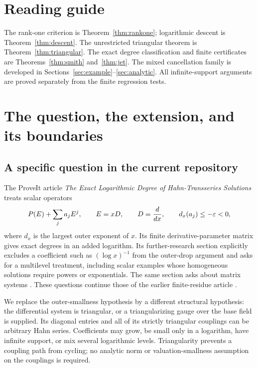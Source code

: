 \documentclass[11pt,a4paper]{article}
\numberwithin{equation}{section}
\theoremstyle{definition}
\theoremstyle{remark}\newtheorem{remark}[theorem]{Remark}
\begin{document}
\section*{Reading guide}
The rank-one criterion is Theorem~\ref{thm:rankone}; logarithmic descent is Theorem~\ref{thm:descent}. The unrestricted triangular theorem is Theorem~\ref{thm:triangular}. The exact degree classification and finite certificates are Theorems~\ref{thm:smith} and~\ref{thm:jet}. The mixed cancellation family is developed in Sections~\ref{sec:example}--\ref{sec:analytic}. All infinite-support arguments are proved separately from the finite regression tests.
\clearpage

\section{The question, the extension, and its boundaries}
\label{sec:intro}
\subsection{A specific question in the current repository}
The ProveIt article \emph{The Exact Logarithmic Degree of Hahn-Transseries Solutions} treats scalar operators
\begin{equation}
 P(E)+\sum_j a_j E^j,\qquad E=xD,\qquad D=\frac{d}{dx},
 \qquad d_x(a_j)\le-\varepsilon<0,
 \label{eq:oldclass}
\end{equation}
where $d_x$ is the largest outer exponent of $x$. Its finite derivative-parameter matrix gives exact degrees in an added logarithm. Its further-research section explicitly excludes a coefficient such as $(\log x)^{-1}$ from the outer-drop argument and asks for a multilevel treatment, including scalar examples whose homogeneous solutions require powers or exponentials. The same section asks about matrix systems \cite{repo-smith}. These questions continue those of the earlier finite-residue article \cite{repo-residue}.

We replace the outer-smallness hypothesis by a different structural hypothesis: the differential system is triangular, or a triangularizing gauge over the base field is supplied. Its diagonal entries and all of its strictly triangular couplings can be arbitrary Hahn series. Coefficients may grow, be small only in a logarithm, have infinite support, or mix several logarithmic levels. Triangularity prevents a coupling path from cycling; no analytic norm or valuation-smallness assumption on the couplings is required.
\end{document}
